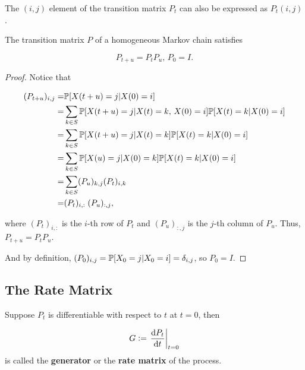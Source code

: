 \begin{remark}
    The $(i,j)$ element of the transition matrix $P_t$ can also be expressed as $P_t(i, j)$.
\end{remark}

\begin{theorem}
    The transition matrix $P$ of a homogeneous Markov chain satisfies

    \begin{equation*}
        P_{t+u} = P_t P_u, \, P_0 = I.
    \end{equation*}

    \begin{proof}
        Notice that

        \begin{align*}
            (P_{t+u})_{i,j} = & \mathbb{P}[X(t+u) = j | X(0) = i] \\ 
            = & \sum_{k \in S} \mathbb{P}[X(t+u) = j | X(t) = k, \, X(0) = i] \mathbb{P}[X(t) = k | X(0) = i] \\ 
            = & \sum_{k \in S} \mathbb{P}[X(t+u) = j | X(t) = k] \mathbb{P}[X(t) = k | X(0) = i] \\ 
            = & \sum_{k \in S} \mathbb{P}[X(u) = j | X(0) = k] \mathbb{P}[X(t) = k | X(0) = i] \\ 
            = & \sum_{k \in S} (P_u)_{k, j} (P_t)_{i, k} \\ 
            = & (P_t)_{i, :} \; (P_u)_{:, j},
        \end{align*}

        where $(P_t)_{i, :}$ is the $i$-th row of $P_t$ and $(P_u)_{:, j}$ is the $j$-th column of $P_u$. Thus, $P_{t+u} = P_t P_u$. 

        And by definition, $(P_0)_{i,j} = \mathbb{P}[X_0 = j | X_0 = i] = \delta_{i,j}$, so $P_0 = I$.
    \end{proof}
\end{theorem}

\subsection{The Rate Matrix} 

\begin{definition}
    Suppose $P_t$ is differentiable with respect to $t$ at $t = 0$, then 

    \begin{equation*}
        G :=  \left. \frac{\dif P_t}{\dif t} \right|_{t = 0}
    \end{equation*}
    is called the \textbf{generator} or the \textbf{rate matrix} of the process.
\end{definition}

